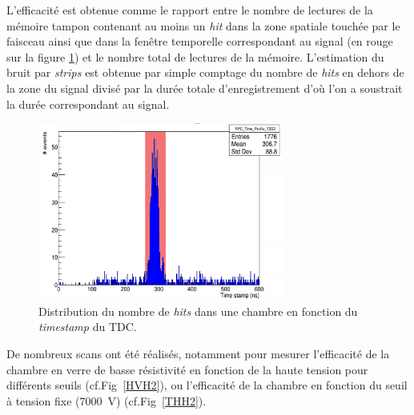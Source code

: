 L'efficacité est obtenue comme le rapport entre le nombre de lectures de la mémoire tampon contenant au moins un \textit{hit} dans la zone spatiale touchée par le faisceau ainsi que dans la fenêtre temporelle correspondant au signal (en rouge sur la figure \ref{struch2}) et le nombre total de lectures de la mémoire. L'estimation du bruit par \textit{strips} est obtenue par simple comptage du nombre de \textit{hits} en dehors de la zone du signal divisé par la durée totale d'enregistrement d'où l'on a soustrait la durée correspondant au signal.

\begin{figure}[!ht]
	\centering
	\includegraphics[width=0.72\textwidth]{GLA/STRUCH2.png}
	\caption{Distribution du nombre de \textit{hits} dans une chambre en fonction du \textit{timestamp} du TDC.}
	\label{struch2}
\end{figure}

De nombreux scans ont été réalisés, notamment pour mesurer l'efficacité de la chambre en verre de basse résistivité en fonction de la haute tension pour différents seuils (cf.Fig~\ref{HVH2}), ou l'efficacité de la chambre en fonction du seuil à tension fixe (\SI{7000}{\volt}) (cf.Fig~\ref{THH2}).

